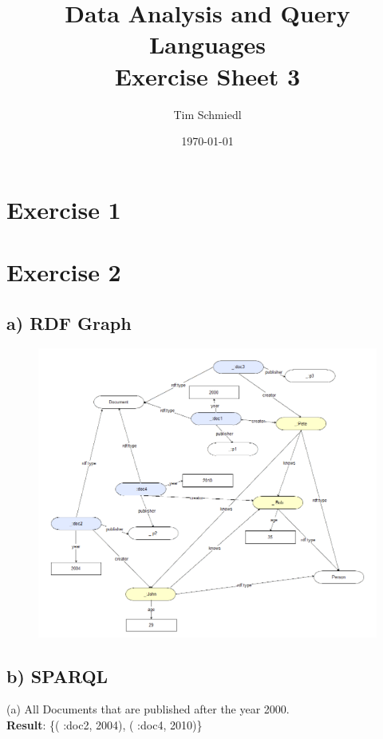 \documentclass{article}
\begin{document}
\title{Data Analysis and Query Languages \\
 Exercise Sheet 3}
\date{\today}
\author{Tim Schmiedl} 
\maketitle

\section*{Exercise 1}
 


\vspace{2cm}
\section*{Exercise 2}
\subsection*{a) RDF Graph}
\begin{figure}[h!]
    \includegraphics[width=1.2\textwidth]{img/rdf-graph.png}
\end{figure}

\subsection*{b) SPARQL}
\vspace{0.3cm}
(a) All Documents that are published after the year 2000.\\
\textbf{Result}: \{( :doc2, 2004), ( :doc4, 2010)\}\\
\vspace{0.3cm}
\end{document}
